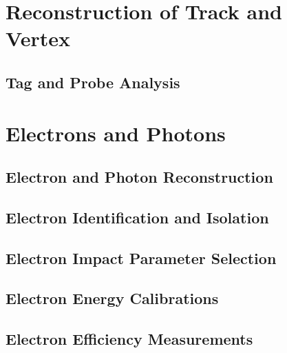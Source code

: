 \section{Reconstruction of Track and Vertex}
\label{sec:track_reco}


\subsection{Tag and Probe Analysis}
\label{sec:track_reco}

\section{Electrons and Photons}

\subsection{Electron and Photon Reconstruction}
\label{sec:eleReco}
%


\subsection{Electron Identification and Isolation}
\label{sec:eleID}


\subsection{Electron Impact Parameter Selection}                                                                                                                                                                                                 
\label{sec:eleSIP}  

%

\subsection{Electron Energy Calibrations}


\subsection{Electron Efficiency Measurements}
\label{sec:eleEffMeas}


